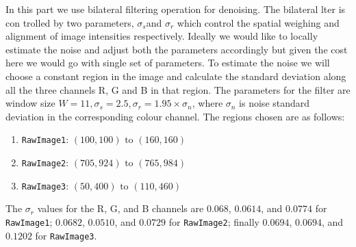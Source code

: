 \documentclass[11pt, a4]{article}
\begin{document}
\begin{enumerate}
			In this part we use bilateral filtering operation for denoising. The bilateral lter is con
			trolled by two parameters, $\sigma_s $and $\sigma_r $ which control the spatial weighing and
			alignment of image intensities respectively. Ideally we would like to locally
			estimate the noise and adjust both the parameters accordingly but given the
			cost here we would go with single set of parameters. To estimate the noise we
			will choose a constant region in the image and calculate the standard deviation  along all the three channels R, G and B in that region. The parameters for the
			filter are window size $W=11,\sigma_s=2.5, \sigma_r=1.95\times\sigma_n$, where $\sigma_n$ is noise  standard deviation in
			the corresponding colour channel. The regions chosen are as follows:
			\begin{enumerate}
				\item \texttt{RawImage1}: $(100, 100)\text{ to }(160, 160)$
				\item \texttt{RawImage2}: $(705, 924)\text{ to }(765, 984)$
				\item \texttt{RawImage3}: $(50, 400)\text{ to }(110, 460)$
			\end{enumerate}
			The $\sigma_r$ values for the R, G, and B channels are $0.068$, $0.0614$, and $0.0774$ for \texttt{RawImage1}; $0.0682$, $0.0510$, and $0.0729$ for \texttt{RawImage2}; finally $0.0694$, $0.0694$, and $0.1202$ for \texttt{RawImage3}.
			\begin{figure}[H]
				\centering
\end{figure}
\end{enumerate}
\end{document}
